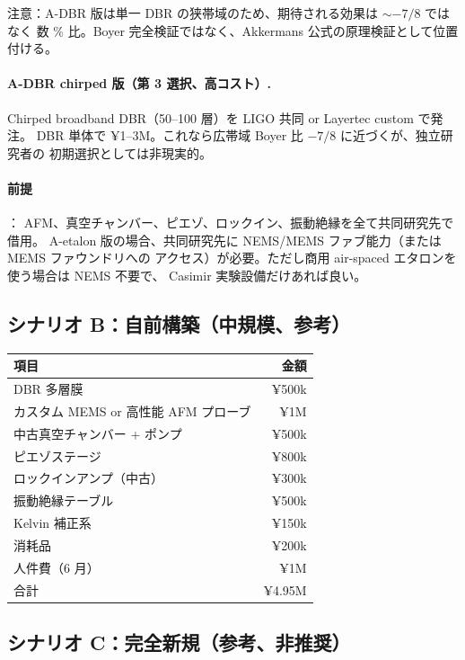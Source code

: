 \documentclass[11pt,a4paper]{article}
\def\textbf#1{#1}%
\begin{document}
\textbf{注意}：A-DBR 版は単一 DBR の狭帯域のため、期待される効果は $\sim -7/8$ ではなく
\textbf{数 \% 比}。Boyer 完全検証ではなく、Akkermans 公式の原理検証として位置付ける。

\paragraph{A-DBR chirped 版（第 3 選択、高コスト）.}
Chirped broadband DBR（50--100 層）を LIGO 共同 or Layertec custom で発注。
DBR 単体で ¥1--3M。これなら広帯域 Boyer 比 $-7/8$ に近づくが、独立研究者の
初期選択としては非現実的。

\paragraph{前提}：
AFM、真空チャンバー、ピエゾ、ロックイン、振動絶縁を全て共同研究先で借用。
A-etalon 版の場合、共同研究先に NEMS/MEMS ファブ能力（または MEMS ファウンドリへの
アクセス）が必要。ただし商用 air-spaced エタロンを使う場合は NEMS 不要で、
Casimir 実験設備だけあれば良い。

\subsection{シナリオ B：自前構築（中規模、参考）}

\begin{center}
\begin{tabular}{lr}
\toprule
項目 & 金額 \\
\midrule
DBR 多層膜 & ¥500k \\
カスタム MEMS or 高性能 AFM プローブ & ¥1M \\
中古真空チャンバー + ポンプ & ¥500k \\
ピエゾステージ & ¥800k \\
ロックインアンプ（中古） & ¥300k \\
振動絶縁テーブル & ¥500k \\
Kelvin 補正系 & ¥150k \\
消耗品 & ¥200k \\
人件費（6 月） & ¥1M \\
\midrule
\textbf{合計} & \textbf{¥4.95M} \\
\bottomrule
\end{tabular}
\end{center}

\subsection{シナリオ C：完全新規（参考、非推奨）}
\end{document}
